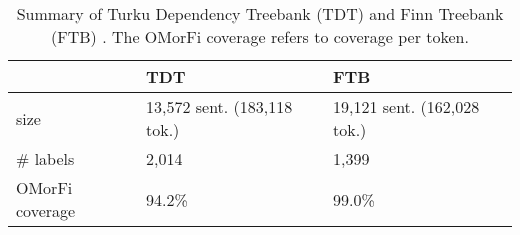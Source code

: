 \documentclass[smallextended]{svjour3}       %
\begin{document}
\begin{table}[h!]
\begin{center}
\begin{tabular}{lll} 
\hline
\noalign{\smallskip}
 & TDT & FTB \\
\hline
\noalign{\smallskip}
size & 13,572 sent. (183,118 tok.) & 19,121 sent. (162,028 tok.) \\
\# labels & 2,014 & 1,399 \\
OMorFi coverage & 94.2\% & 99.0\% \\
\end{tabular}
\end{center}
\caption{Summary of Turku Dependency Treebank (TDT) \citep{haverinen2009,haverinen2013} and Finn Treebank (FTB) \citep{voutilainen2011}. The OMorFi coverage refers to coverage per token.}
\label{tab: tdt ftb} 
\end{table}


 
\end{document}
